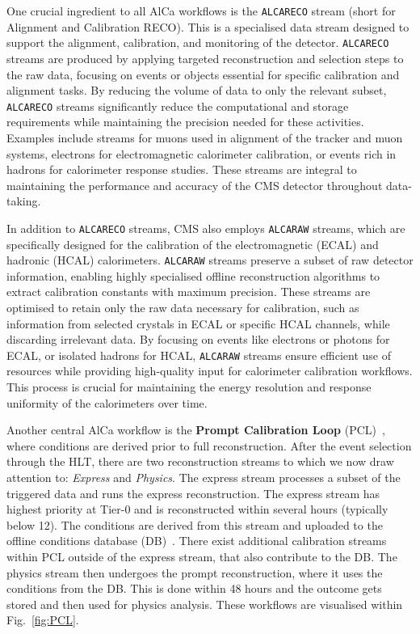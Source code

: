 One crucial ingredient to all AlCa workflows is the \texttt{ALCARECO} stream (short for Alignment and Calibration RECO).
This is a specialised data stream designed to support the alignment, calibration, and monitoring of the detector. \texttt{ALCARECO} streams are produced by applying targeted reconstruction and selection steps to the raw data, focusing on events or objects essential for specific calibration and alignment tasks.
By reducing the volume of data to only the relevant subset, \texttt{ALCARECO} streams significantly reduce the computational and storage requirements while maintaining the precision needed for these activities. Examples include streams for muons used in alignment of the tracker and muon systems, electrons for electromagnetic calorimeter calibration, or events rich in hadrons for calorimeter response studies. These streams are integral to maintaining the performance and accuracy of the CMS detector throughout data-taking.

In addition to \texttt{ALCARECO} streams, CMS also employs \texttt{ALCARAW} streams, which are specifically designed for the calibration of the electromagnetic (ECAL) and hadronic (HCAL) calorimeters. \texttt{ALCARAW} streams preserve a subset of raw detector information, enabling highly specialised offline reconstruction algorithms to extract calibration constants with maximum precision.
These streams are optimised to retain only the raw data necessary for calibration, such as information from selected crystals in ECAL or specific HCAL channels, while discarding irrelevant data. By focusing on events like electrons or photons for ECAL, or isolated hadrons for HCAL, \texttt{ALCARAW} streams ensure efficient use of resources while providing high-quality input for calorimeter calibration workflows. This process is crucial for maintaining the energy resolution and response uniformity of the calorimeters over time.

Another central AlCa workflow is the \textbf{Prompt Calibration Loop} (PCL)~\cite{Futyan:2010zz,Cerminara:2015hov}, where conditions are derived prior to full reconstruction. After the event selection through the HLT, there are two reconstruction streams to which we now draw attention to: \textit{Express} and \textit{Physics}. The express stream processes a subset of the triggered data and runs the express reconstruction. The express stream has highest priority at Tier-0 and is reconstructed within several hours (typically below 12). The conditions are derived from this stream and uploaded to the offline conditions database (DB)~\cite{Guida:2015gvw}. There exist additional calibration streams within PCL outside of the express stream, that also contribute to the DB.
The physics stream then undergoes the prompt reconstruction, where it uses the conditions from the DB. This is done within 48 hours and the outcome gets stored and then used for physics analysis. These workflows are visualised within Fig.~\ref{fig:PCL}.

